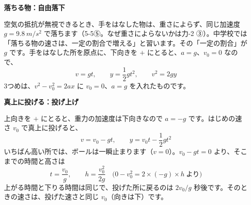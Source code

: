 \noindent\textbf{落ちる物：自由落下}\par
\noindent\label{ph:力-1:rakka}空気の抵抗が無視できるとき、手をはなした物は、重さによらず、同じ加速度 $g=\qty{9.8}{m/s^2}$ で落ちます（5-5⑤。なぜ重さによらないかは力-2 ③）。中学校では「落ちる物の速さは、一定の割合で増える」と習います。その「一定の割合」が $g$ です。手をはなした所を原点に、下向きを $+$ にとると、$a=g$、$v_0=0$ なので、
\[ v=gt,\qquad y=\frac{1}{2}gt^2,\qquad v^2=2gy \]
3つめは、$v^2-v_0^2=2ax$ に $v_0=0$、$a=g$ を入れたものです。

\noindent\textbf{真上に投げる：投げ上げ}\par
\noindent\label{ph:力-1:nageage}上向きを $+$ にとると、重力の加速度は下向きなので $a=-g$ です。はじめの速さ $v_0$ で真上に投げると、
\[ v=v_0-gt,\qquad y=v_0t-\frac{1}{2}gt^2 \]
いちばん高い所では、ボールは一瞬止まります（$v=0$）。$v_0-gt=0$ より、そこまでの時間と高さは
\[ t=\frac{v_0}{g},\qquad h=\frac{v_0^2}{2g}\quad\bigl(0-v_0^2=2\times(-g)\times h\ \text{より}\bigr) \]
上がる時間と下りる時間は同じで、投げた所に戻るのは $2v_0/g$ 秒後です。そのときの速さは、投げた速さと同じ $v_0$（向きは下）です。

\begin{phflow}[加速度が一定の運動]
\end{phflow}

